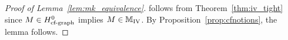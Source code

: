 \begin{proof}[Proof of Lemma~\ref{lem:mk_equivalence}]
 \bm{$\mkgraph = \mkiv$} follows from Theorem~\ref{thm:iv_tight} since $M \in H^0_{\text{cf-graph}}$ implies $M \in \mathbb{M}_{\text{IV}}$. By Proposition~\ref{prop:cfnotions}, the lemma follows. 

 
 



\end{proof}
